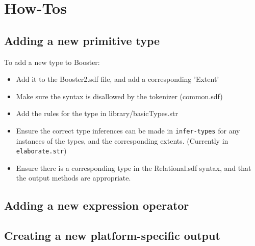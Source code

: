 \chapter{How-Tos}

\section{Adding a new primitive type}
\label{sec:addNewType}
To add a new type to Booster:
\begin{itemize}
\item Add it to the Booster2.sdf file, and add a corresponding 'Extent' 
\item Make sure the syntax is disallowed by the tokenizer (common.sdf)
\item Add the rules for the type in library/basicTypes.str
\item Ensure the correct type inferences can be made in
  \verb|infer-types| for any instances of the types, and the
  corresponding extents. (Currently in \verb|elaborate.str|)
\item Ensure there is a corresponding type in the Relational.sdf
  syntax, and that the output methods are appropriate.
\end{itemize}

\section{Adding a new expression operator}
\label{sec:addNewExpressionOp}


\section{Creating a new platform-specific output}

